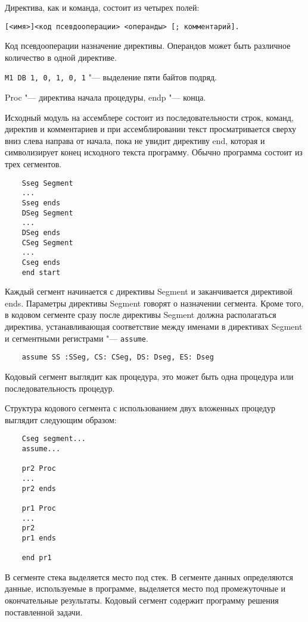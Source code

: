 Директива, как и команда, состоит из четырех полей:

\verb|[<имя>]<код псевдооперации> <операнды> [; комментарий].|

Код псевдооперации  назначение директивы.
Операндов может быть различное количество в одной директиве.

\verb|M1 DB 1, 0, 1, 0, 1| "--- выделение пяти байтов подряд.

Proc "--- директива начала процедуры, endp "--- конца.

Исходный модуль на ассемблере состоит из последовательности строк, команд, директив и комментариев
и при ассемблировании текст просматривается сверху вниз слева направа от начала, пока
не увидит директиву end, которая и символизирует конец исходного текста программу.
Обычно программа состоит из трех сегментов. 

\begin{verbatim}
    Sseg Segment
    ...
    Sseg ends
    DSeg Segment
    ...
    DSeg ends
    CSeg Segment
    ...
    Cseg ends
    end start
\end{verbatim}

Каждый сегмент начинается с директивы Segment и заканчивается директивой ends. Параметры
директивы Segment говорят о назначении сегмента. Кроме того, в кодовом сегменте сразу
после директивы Segment должна располагаться директива, устанавливающая соответствие
между именами в директивах Segment и сегментными регистрами "--- \verb|assume|.

\begin{verbatim}
    assume SS :SSeg, CS: CSeg, DS: Dseg, ES: Dseg
\end{verbatim}

Кодовый сегмент выглядит как процедура, это может быть одна процедура или последовательность
процедур.

Структура кодового сегмента с использованием двух вложенных процедур выглядит следующим
образом:

\begin{verbatim}
    Cseg segment...
    assume...

    pr2 Proc
    ...
    pr2 ends

    pr1 Proc
    ...
    pr2
    pr1 ends

    end pr1
\end{verbatim}

В сегменте стека выделяется место под стек.
В сегменте данных определяются данные, используемые в программе, выделяется место
под промежуточные и окончательные результаты.
Кодовый сегмент содержит программу решения поставленной задачи.

